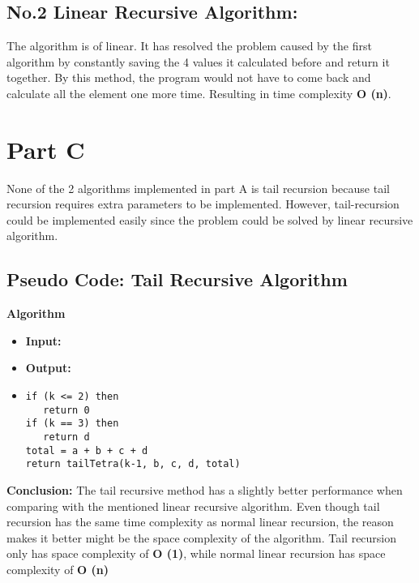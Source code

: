 \documentclass{article}
\begin{document}
\subsection*{No.2 Linear Recursive Algorithm:}
The algorithm is of linear. It has resolved the problem caused by the first algorithm by constantly saving the 4 values it calculated before and return it together. By this method, the program would not have to come back and calculate all the element one more time. Resulting in time complexity \textbf{O (n)}.

\section*{Part C}%
None of the 2 algorithms implemented in part A is tail recursion because tail recursion requires extra parameters to be implemented.
However, tail-recursion could be implemented easily since the problem could be solved by linear recursive algorithm.
\subsection*{Pseudo Code: Tail Recursive Algorithm}
\textbf{Algorithm }  
\begin{itemize}
	\item[]\textbf{Input: }  
	\item[]\textbf{Output: } 
\item[]\begin{verbatim}
if (k <= 2) then 
   return 0
if (k == 3) then
   return d 
total = a + b + c + d
return tailTetra(k-1, b, c, d, total)
\end{verbatim}

\end{itemize}

\textbf{Conclusion:} The tail recursive method has a slightly better performance when comparing with the mentioned linear recursive algorithm. Even though tail recursion has the same time complexity as normal linear recursion, the reason makes it better might be the space complexity of the algorithm. Tail recursion only has space complexity of \textbf{O (1)}, while normal linear recursion has space complexity of \textbf{O (n)}
\end{document}
